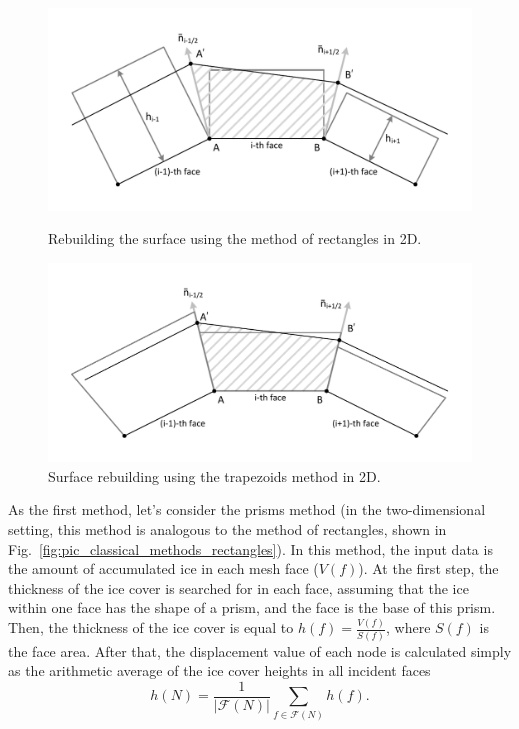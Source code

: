 \documentclass[
11pt,
tightenlines,
twoside,
onecolumn,
nofloats,
nobibnotes,
nofootinbib,
superscriptaddress,
noshowpacs,
centertags]
{revtex4}
\begin{document}
\begin{figure}[h]
  \centering
  \begin{minipage}[h]{0.6\textwidth}
    \includegraphics[width=\textwidth]{pics/pic_classical_methods_rectangles_size.pdf}
    \caption{Rebuilding the surface using the method of rectangles in 2D.}\label{fig:pic_classical_methods_rectangles}
  \end{minipage}
  \hfill
  \begin{minipage}[h]{0.6\textwidth}
    \includegraphics[width=\textwidth]{pics/pic_classical_methods_trapezoids_size.pdf}
    \caption{Surface rebuilding using the trapezoids method in 2D.}\label{fig:pic_classical_methods_trapezoids}
  \end{minipage}
\end{figure}

As the first method, let's consider the prisms method (in the two-dimensional setting, this method is analogous to the method of rectangles, shown in Fig.~\ref{fig:pic_classical_methods_rectangles}).
In this method, the input data is the amount of accumulated ice in each mesh face ($V(f)$).
At the first step, the thickness of the ice cover is searched for in each face, assuming that the ice within one face has the shape of a prism, and the face is the base of this prism.
Then, the thickness of the ice cover is equal to $h(f) =
\frac{V(f)}{S(f)}$, where $S(f)$ is the face area.
After that, the displacement value of each node is calculated simply
as the arithmetic average of the ice cover heights in all incident
faces
\begin{equation*}
h(N) = \frac{1}{|\mathscr{F}(N)|} \sum_{f \in \mathscr{F}(N)}{h(f)}.
\end{equation*}
\end{document}
